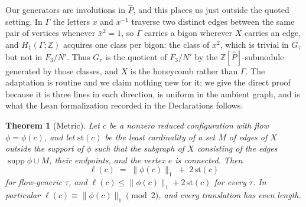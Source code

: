 \documentclass[11pt]{article}
\newtheorem{theorem}{Theorem}[section]
\theoremstyle{definition}
\theoremstyle{remark}
\newcommand{\Z}{\mathbb{Z}}
\begin{document}
Our generators are involutions in $\widehat P$, and this places us just outside
the quoted setting. In $\Gamma$ the letters $x$ and $x^{-1}$ traverse two
distinct edges between the same pair of vertices whenever $\bar x^2=1$, so
$\Gamma$ carries a bigon wherever $X$ carries an edge, and $H_1(\Gamma;\Z)$
acquires one class per bigon: the class of $x^2$, which is trivial in
$G_\tau$ but not in $F_3/N'$. Thus $G_\tau$ is the quotient of $F_3/N'$ by the
$\Z[\widehat P]$-submodule generated by those classes, and $X$ is the honeycomb
rather than $\Gamma$. The adaptation is routine and we claim nothing new for it;
we give the direct proof because it is three lines in each direction, is
uniform in the ambient graph, and is what the Lean formalization recorded in the
Declarations follows.

\begin{theorem}[Metric]\label{thm:metric}
Let $c$ be a nonzero reduced configuration with flow $\phi=\phi(c)$, and let
$\mathrm{st}(c)$ be the least cardinality of a set $M$ of edges of $X$
outside the support of $\phi$ such that the subgraph of $X$ consisting of
the edges $\operatorname{supp}\phi\cup M$, their endpoints, and the vertex
$e$ is connected. Then
\[
 \ell(c)\;=\;\|\phi(c)\|_1\;+\;2\,\mathrm{st}(c)
\]
for flow-generic $\tau$, and $\ell(c)\le\|\phi(c)\|_1+2\,\mathrm{st}(c)$ for
every $\tau$. In particular $\ell(c)\equiv\|\phi(c)\|_1\pmod2$, and every
translation has even length.
\end{theorem}
\end{document}
